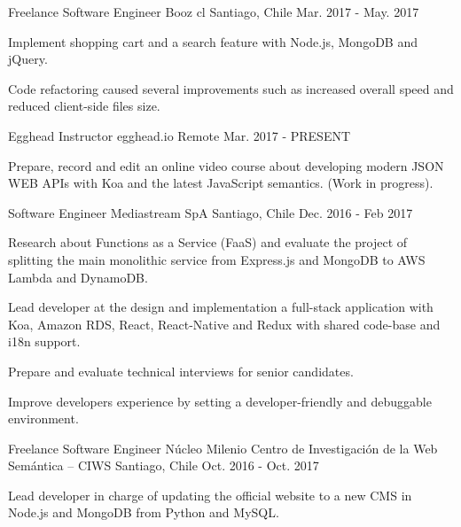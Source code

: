 \begin{cventries}
  \cventry
    {Freelance Software Engineer}
    {Booz cl}
    {Santiago, Chile}
    {Mar. 2017 - May. 2017}
    {
      \begin{cvitems}
        \item {Implement shopping cart and a search feature with Node.js, MongoDB and jQuery.}
        \item {Code refactoring caused several improvements such as increased overall speed and reduced client-side files size.}
      \end{cvitems}
    }
    
  \cventry
    {Egghead Instructor}
    {egghead.io}
    {Remote}
    {Mar. 2017 - PRESENT}
    {
      \begin{cvitems}
        \item {Prepare, record and edit an online video course about developing modern JSON WEB APIs with Koa and the latest JavaScript semantics. (Work in progress).}
      \end{cvitems}
    }
    
  \cventry
    {Software Engineer}
    {Mediastream SpA}
    {Santiago, Chile}
    {Dec. 2016 - Feb 2017}
    {
      \begin{cvitems}
        \item {Research about Functions as a Service (FaaS) and evaluate the project of splitting the main monolithic service from Express.js and MongoDB to AWS Lambda and DynamoDB.}
        \item {Lead developer at the design and implementation a full-stack application with Koa, Amazon RDS, React, React-Native and Redux with shared code-base and i18n support.}
        \item {Prepare and evaluate technical interviews for senior candidates.}
        \item {Improve developers experience by setting a developer-friendly and debuggable environment.}
      \end{cvitems}
    }
    
  \cventry
    {Freelance Software Engineer}
    {Núcleo Milenio Centro de Investigación de la Web Semántica – CIWS}
    {Santiago, Chile}
    {Oct. 2016 - Oct. 2017}
    {
      \begin{cvitems}
        \item {Lead developer in charge of updating the official website to a new CMS in Node.js and MongoDB from Python and MySQL.}
      \end{cvitems}
    }

\end{cventries}
